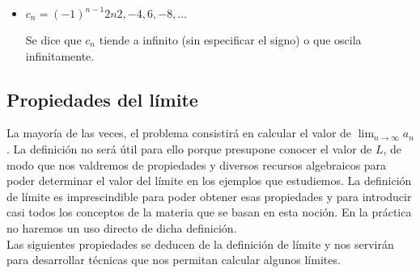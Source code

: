 \documentclass[../Teoría.root.tex]{subfiles}
\begin{document}
\begin{itemize}
\begin{center}
\begin{scaletikzpicturetowidth}{.5\linewidth}
              \end{scaletikzpicturetowidth}
          \end{center}
          \[\lim_{n\to\infty}b_n\,\text{no existe}\] En este caso se dice que \(a_n\) oscila finitamente.
    \item \(c_n=(-1)^{n-1}2n\)\tab\(2,-4,6,-8,\dots\)
          \begin{center}
              \begin{scaletikzpicturetowidth}{.5\linewidth}
              \end{scaletikzpicturetowidth}
          \end{center}
          Se dice que \(c_n\) tiende a infinito (sin especificar el signo) o que oscila infinitamente.
\end{itemize}
\subsection{Propiedades del límite}
La mayoría de las veces, el problema consistirá en calcular el valor de \(\lim_{n\to\infty}a_n\).
La definición no será útil para ello porque presupone conocer el valor de \(L\), de modo que nos valdremos de propiedades y diversos recursos algebraicos para poder determinar el valor del límite en los ejemplos que estudiemos.
La definición de límite es imprescindible para poder obtener esas propiedades y para introducir casi todos los conceptos de la materia que se basan en esta noción.
En la práctica no haremos un uso directo de dicha definición.\\
Las siguientes propiedades se deducen de la definición de límite y nos servirán para desarrollar técnicas que nos permitan calcular algunos límites.
\end{document}
